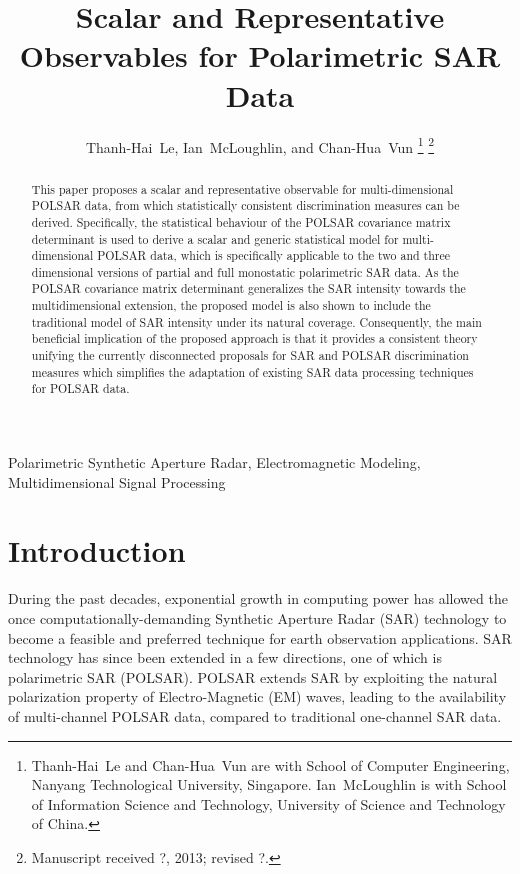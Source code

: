 \documentclass[journal]{IEEEtran}
\title{
  Scalar and Representative Observables for Polarimetric SAR Data
}
\author{Thanh-Hai~Le,
        Ian~McLoughlin, 
	and Chan-Hua~Vun%
\thanks{Thanh-Hai~Le and Chan-Hua~Vun are with School of Computer Engineering, 
Nanyang Technological University, Singapore. Ian~McLoughlin is with School of Information Science and Technology,
University of Science and Technology of China.
}%
\thanks{Manuscript received ?, 2013; revised ?.}}
\begin{document}
\maketitle

\begin{abstract}
This paper proposes a scalar and representative observable for multi-dimensional POLSAR data,
  from which statistically consistent discrimination measures can be derived.
Specifically, the statistical behaviour of the POLSAR covariance matrix determinant is used
  to derive a scalar and generic statistical model for multi-dimensional POLSAR data,
  which is specifically applicable to the two and three dimensional versions of partial and full monostatic polarimetric SAR data.
As the POLSAR covariance matrix determinant generalizes the SAR intensity towards the multidimensional extension,
  the proposed model is also shown to include the traditional model of SAR intensity under its natural coverage.
Consequently, the main beneficial implication of the proposed approach is that
  it provides a consistent theory unifying the currently disconnected proposals for SAR and POLSAR discrimination measures
  which simplifies the adaptation of existing SAR data processing techniques for POLSAR data.
\end{abstract}

\begin{IEEEkeywords}
Polarimetric Synthetic Aperture Radar, Electromagnetic Modeling, Multidimensional Signal Processing  
\end{IEEEkeywords}

\IEEEpeerreviewmaketitle

\section{Introduction}

During the past decades, exponential growth in computing power has allowed the once computationally-demanding Synthetic Aperture Radar (SAR)
technology to become a feasible and preferred technique for earth observation applications.
SAR technology has since been extended in a few directions, one of which is polarimetric SAR (POLSAR).
POLSAR extends SAR by exploiting the natural polarization property of Electro-Magnetic (EM) waves,
  leading to the availability of multi-channel POLSAR data, compared to traditional one-channel SAR data.
  
\end{document}
